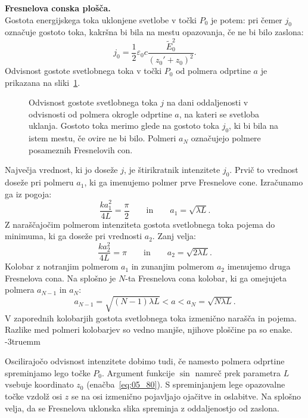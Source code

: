 \begin{example}{\bf Fresnelova conska plošča.}
\begin{equation}
\label{eq:05_81a}
\end{equation}
Gostota energijskega toka uklonjene svetlobe v točki $P_0$ je potem:
pri čemer $j_0$ označuje gostoto toka, kakršna bi bila na mestu opazovanja, 
če ne bi bilo zaslona:
\begin{equation}
j_0 = \frac{1}{2}\varepsilon_0 c \frac{\tilde{E}_0^2}{(z_0'+z_0)^2}.
\label{eq:05_83}
\end{equation}
Odvisnost gostote svetlobnega toka v točki $P_0$ od polmera odprtine
$a$ je prikazana na sliki~\ref{fig:05_FresCona2}. 
\begin{figure}[ht]
\centering
\def\svgwidth{90truemm} 

\caption{Odvisnost gostote svetlobnega toka $j$ na dani oddaljenosti v odvisnosti od polmera
okrogle odprtine $a$, na kateri se svetloba uklanja. Gostoto toka merimo glede na
gostoto toka $j_0$, ki bi bila na istem mestu, če ovire ne bi bilo. Polmeri $a_N$ označujejo
polmere posameznih Fresnelovih con.}
\label{fig:05_FresCona2}
\end{figure}

Največja vrednost, ki jo doseže $j$, je štirikratnik intenzitete $j_0$. Prvič to 
vrednost doseže pri polmeru $a_1$, ki ga imenujemo polmer
prve Fresnelove cone. Izračunamo ga iz pogoja:
\begin{equation}
\frac{ka_1^2}{4L} = \frac{\pi}{2}\qquad \mathrm{in} \qquad a_1  = \sqrt{\lambda L}.
\label{eq:05_84a}
\end{equation}
Z naraščajočim polmerom intenziteta gostota svetlobnega toka pojema do minimuma, 
ki ga doseže pri vrednosti $a_2$. Zanj velja:
\begin{equation}
\frac{ka_2^2}{4L} = \pi \qquad \mathrm{in} \qquad a_2 = \sqrt{2\lambda L}.
\end{equation}
Kolobar z notranjim polmerom $a_1$ in zunanjim polmerom 
$a_2$ imenujemo druga Fresnelova cona. 
Na splošno je $N$-ta Fresnelova cona kolobar, ki ga omejujeta polmera $a_{N-1}$ in $a_N$:
\begin{equation}
a_{N-1} = \sqrt{(N-1)\lambda L} < a < a_{N} = \sqrt{N \lambda L}.
\label{eq:05_90}
\end{equation}
V zaporednih kolobarjih gostota svetlobnega toka izmenično narašča in pojema. Razlike med
polmeri kolobarjev so vedno manjše, njihove ploščine pa so enake.
\vglue-3truemm
\begin{remark}
Oscilirajočo odvisnost intenzitete dobimo tudi, če namesto polmera odprtine 
spreminjamo lego točke $P_0$. Argument funkcije $\sin$ namreč prek parametra $L$
vsebuje koordinato $z_0$ (enačba~\ref{eq:05_80}). 
S spreminjanjem lege opazovalne točke vzdolž osi $z$
se na osi izmenično pojavljajo ojačitve in oslabitve. Na splošno velja, da se 
Fresnelova uklonska slika spreminja z oddaljenostjo od zaslona.
\end{remark}


\end{example}

